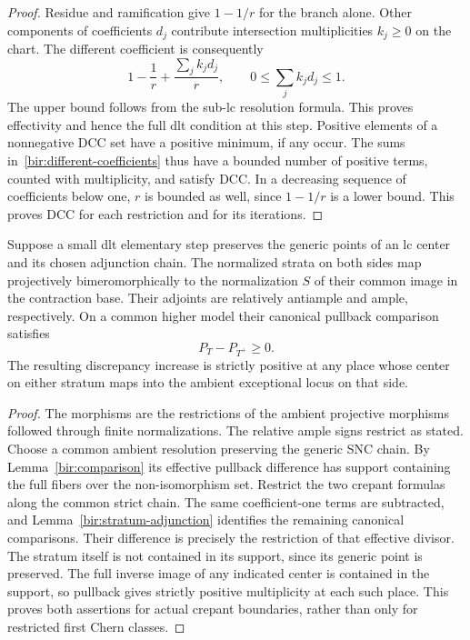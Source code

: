 \begin{proof}
Residue and ramification give $1-1/r$ for the branch alone.  Other
components of coefficients $d_j$ contribute intersection
multiplicities $k_j\geq0$ on the chart.  The different coefficient
is consequently
\begin{equation}
 1-\frac1r+\frac{\sum_jk_jd_j}{r},
 \qquad 0\leq\sum_jk_jd_j\leq1.
 \label{bir:different-coefficients}
\end{equation}
The upper bound follows from the sub-lc resolution formula.  This
proves effectivity and hence the full dlt condition at this step.
Positive elements of a nonnegative DCC set have a positive minimum,
if any occur.  The sums in~\eqref{bir:different-coefficients} thus
have a bounded number of positive terms, counted with multiplicity,
and satisfy DCC.  In a decreasing sequence of coefficients below
one, $r$ is bounded as well, since $1-1/r$ is a lower bound.  This
proves DCC for each restriction and for its iterations.
\end{proof}

\begin{lemma}
\label{bir:stratum-comparison}
Suppose a small dlt elementary step preserves the generic points of
an lc center and its chosen adjunction chain.  The normalized
strata on both sides map projectively bimeromorphically to the
normalization $S$ of their common image in the contraction base.
Their adjoints are relatively antiample and ample, respectively.
On a common higher model their canonical pullback comparison
satisfies
\begin{equation}
 P_T-P_{T^+}\geq0.
 \label{bir:stratum-increase}
\end{equation}
The resulting discrepancy increase is strictly positive at any
place whose center on either stratum maps into the ambient
exceptional locus on that side.
\end{lemma}

\begin{proof}
The morphisms are the restrictions of the ambient projective
morphisms followed through finite normalizations.  The relative
ample signs restrict as stated.  Choose a common ambient resolution
preserving the generic SNC chain.  By
Lemma~\ref{bir:comparison} its effective pullback difference has
support containing the full fibers over the non-isomorphism set.
Restrict the two crepant formulas along the common strict chain.
The same coefficient-one terms are subtracted, and
Lemma~\ref{bir:stratum-adjunction} identifies the remaining canonical
comparisons.  Their difference is precisely the restriction of that
effective divisor.  The stratum itself is not contained in its
support, since its generic point is preserved.  The full inverse
image of any indicated center is contained in the support, so
pullback gives strictly positive multiplicity at each such place.
This proves both assertions for actual crepant boundaries, rather
than only for restricted first Chern classes.
\end{proof}

